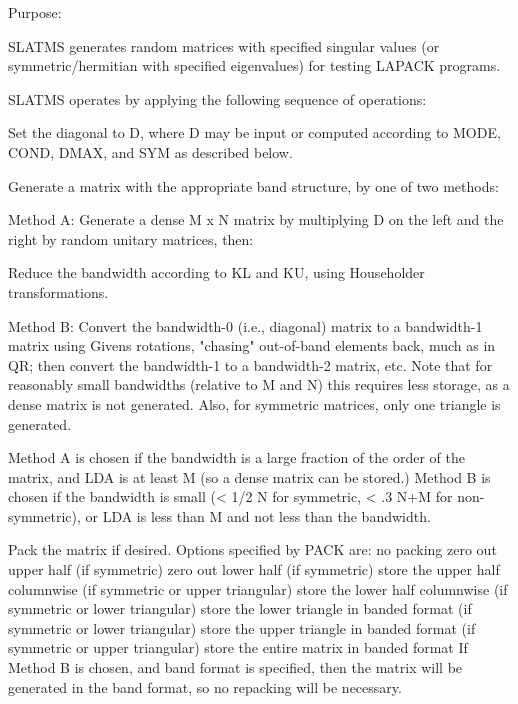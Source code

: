 \begin{DoxyParagraph}{Purpose\+: }
\begin{DoxyVerb}    SLATMS generates random matrices with specified singular values
    (or symmetric/hermitian with specified eigenvalues)
    for testing LAPACK programs.

    SLATMS operates by applying the following sequence of
    operations:

      Set the diagonal to D, where D may be input or
         computed according to MODE, COND, DMAX, and SYM
         as described below.

      Generate a matrix with the appropriate band structure, by one
         of two methods:

      Method A:
          Generate a dense M x N matrix by multiplying D on the left
              and the right by random unitary matrices, then:

          Reduce the bandwidth according to KL and KU, using
          Householder transformations.

      Method B:
          Convert the bandwidth-0 (i.e., diagonal) matrix to a
              bandwidth-1 matrix using Givens rotations, "chasing"
              out-of-band elements back, much as in QR; then
              convert the bandwidth-1 to a bandwidth-2 matrix, etc.
              Note that for reasonably small bandwidths (relative to
              M and N) this requires less storage, as a dense matrix
              is not generated.  Also, for symmetric matrices, only
              one triangle is generated.

      Method A is chosen if the bandwidth is a large fraction of the
          order of the matrix, and LDA is at least M (so a dense
          matrix can be stored.)  Method B is chosen if the bandwidth
          is small (< 1/2 N for symmetric, < .3 N+M for
          non-symmetric), or LDA is less than M and not less than the
          bandwidth.

      Pack the matrix if desired. Options specified by PACK are:
         no packing
         zero out upper half (if symmetric)
         zero out lower half (if symmetric)
         store the upper half columnwise (if symmetric or upper
               triangular)
         store the lower half columnwise (if symmetric or lower
               triangular)
         store the lower triangle in banded format (if symmetric
               or lower triangular)
         store the upper triangle in banded format (if symmetric
               or upper triangular)
         store the entire matrix in banded format
      If Method B is chosen, and band format is specified, then the
         matrix will be generated in the band format, so no repacking
         will be necessary.\end{DoxyVerb}
 
\end{DoxyParagraph}

